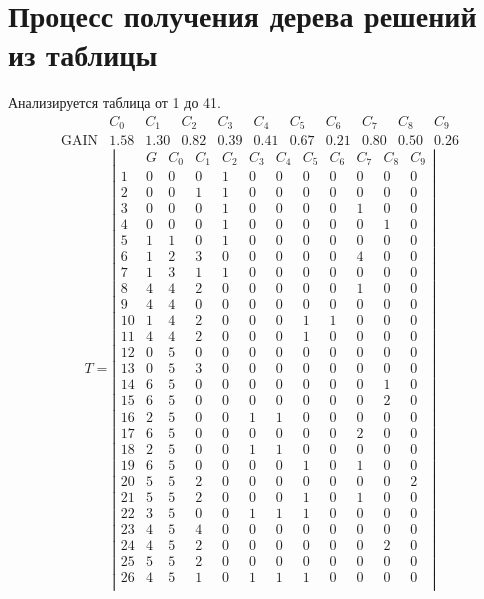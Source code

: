 \section{Процесс получения дерева решений из таблицы}

Анализируется таблица от 1 до 41.
$$ 
\begin{array}{l|c|ccccccccc}
	  & C_{0} & C_{1} & C_{2} & C_{3} & C_{4} & C_{5} & C_{6} & C_{7} & C_{8} & C_{9}\\
 \textrm{GAIN} & 1.58 & 1.30 & 0.82 & 0.39 & 0.41 & 0.67 & 0.21 & 0.80 & 0.50 & 0.26
\end{array}
 $$
$$
T = \left| \begin{array}{lc|c|ccccccccc}
	 & G & C_{0} & C_{1} & C_{2} & C_{3} & C_{4} & C_{5} & C_{6} & C_{7} & C_{8} & C_{9}\\
	1 & 0 & 0 & 0 & 1 & 0 & 0 & 0 & 0 & 0 & 0 & 0\\
	2 & 0 & 0 & 1 & 1 & 0 & 0 & 0 & 0 & 0 & 0 & 0\\
	3 & 0 & 0 & 0 & 1 & 0 & 0 & 0 & 0 & 1 & 0 & 0\\
	4 & 0 & 0 & 0 & 1 & 0 & 0 & 0 & 0 & 0 & 1 & 0\\
	5 & 1 & 1 & 0 & 1 & 0 & 0 & 0 & 0 & 0 & 0 & 0\\
	6 & 1 & 2 & 3 & 0 & 0 & 0 & 0 & 0 & 4 & 0 & 0\\
	7 & 1 & 3 & 1 & 1 & 0 & 0 & 0 & 0 & 0 & 0 & 0\\
	8 & 4 & 4 & 2 & 0 & 0 & 0 & 0 & 0 & 1 & 0 & 0\\
	9 & 4 & 4 & 0 & 0 & 0 & 0 & 0 & 0 & 0 & 0 & 0\\
	10 & 1 & 4 & 2 & 0 & 0 & 0 & 1 & 1 & 0 & 0 & 0\\
	11 & 4 & 4 & 2 & 0 & 0 & 0 & 1 & 0 & 0 & 0 & 0\\
	12 & 0 & 5 & 0 & 0 & 0 & 0 & 0 & 0 & 0 & 0 & 0\\
	13 & 0 & 5 & 3 & 0 & 0 & 0 & 0 & 0 & 0 & 0 & 0\\
	14 & 6 & 5 & 0 & 0 & 0 & 0 & 0 & 0 & 0 & 1 & 0\\
	15 & 6 & 5 & 0 & 0 & 0 & 0 & 0 & 0 & 0 & 2 & 0\\
	16 & 2 & 5 & 0 & 0 & 1 & 1 & 0 & 0 & 0 & 0 & 0\\
	17 & 6 & 5 & 0 & 0 & 0 & 0 & 0 & 0 & 2 & 0 & 0\\
	18 & 2 & 5 & 0 & 0 & 1 & 1 & 0 & 0 & 0 & 0 & 0\\
	19 & 6 & 5 & 0 & 0 & 0 & 0 & 1 & 0 & 1 & 0 & 0\\
	20 & 5 & 5 & 2 & 0 & 0 & 0 & 0 & 0 & 0 & 0 & 2\\
	21 & 5 & 5 & 2 & 0 & 0 & 0 & 1 & 0 & 1 & 0 & 0\\
	22 & 3 & 5 & 0 & 0 & 1 & 1 & 1 & 0 & 0 & 0 & 0\\
	23 & 4 & 5 & 4 & 0 & 0 & 0 & 0 & 0 & 0 & 0 & 0\\
	24 & 4 & 5 & 2 & 0 & 0 & 0 & 0 & 0 & 0 & 2 & 0\\
	25 & 5 & 5 & 2 & 0 & 0 & 0 & 0 & 0 & 0 & 0 & 0\\
	26 & 4 & 5 & 1 & 0 & 1 & 1 & 1 & 0 & 0 & 0 & 0\\
\end{array} \right|
$$

